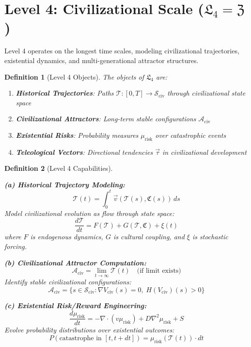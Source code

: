 \documentclass[11pt,twoside]{book}
\newcommand{\Level}[1]{\mathfrak{L}_{#1}}
\newcommand{\Cultural}{\mathfrak{C}}
\newcommand{\Civilizational}{\mathfrak{Z}}
\newcommand{\Trajectory}{\mathcal{T}}
\newtheorem{definition}{Definition}[chapter]
\begin{document}
\section{Level 4: Civilizational Scale ($\Level{4} = \Civilizational$)}

Level 4 operates on the longest time scales, modeling civilizational trajectories,
existential dynamics, and multi-generational attractor structures.

\begin{definition}[Level 4 Objects]
\label{def:L4-objects}
The objects of $\Level{4}$ are:
\begin{enumerate}[label=(\alph*)]
    \item \textbf{Historical Trajectories}: Paths $\Trajectory : [0,T] \to \mathcal{S}_{\mathrm{civ}}$
          through civilizational state space
    \item \textbf{Civilizational Attractors}: Long-term stable configurations
          $\mathcal{A}_{\mathrm{civ}}$
    \item \textbf{Existential Risks}: Probability measures $\mu_{\mathrm{risk}}$ over
          catastrophic events
    \item \textbf{Teleological Vectors}: Directional tendencies $\vec{\tau}$ in
          civilizational development
\end{enumerate}
\end{definition}

\begin{definition}[Level 4 Capabilities]
\label{def:L4-capabilities}

\textbf{(a) Historical Trajectory Modeling:}
\begin{equation}
\boxed{
    \Trajectory(t) = \int_0^t \vec{v}(\Trajectory(s), \Cultural(s)) \, ds
}
\end{equation}
Model civilizational evolution as flow through state space:
\[
    \frac{d\Trajectory}{dt} = F(\Trajectory) + G(\Trajectory, \Cultural) + \xi(t)
\]
where $F$ is endogenous dynamics, $G$ is cultural coupling, and $\xi$ is stochastic forcing.

\textbf{(b) Civilizational Attractor Computation:}
\begin{equation}
\boxed{
    \mathcal{A}_{\mathrm{civ}} = \lim_{t \to \infty} \Trajectory(t)
    \quad \text{(if limit exists)}
}
\end{equation}
Identify stable civilizational configurations:
\[
    \mathcal{A}_{\mathrm{civ}} = \{s \in \mathcal{S}_{\mathrm{civ}} :
    \nabla V_{\mathrm{civ}}(s) = 0, \; H(V_{\mathrm{civ}})(s) > 0\}
\]

\textbf{(c) Existential Risk/Reward Engineering:}
\begin{equation}
\boxed{
    \frac{d\mu_{\mathrm{risk}}}{dt} = -\nabla \cdot (v \mu_{\mathrm{risk}})
    + D \nabla^2 \mu_{\mathrm{risk}} + S
}
\end{equation}
Evolve probability distributions over existential outcomes:
\[
    P(\text{catastrophe in } [t, t+dt]) = \mu_{\mathrm{risk}}(\Trajectory(t)) \cdot dt
\]
\end{definition}
\end{document}
